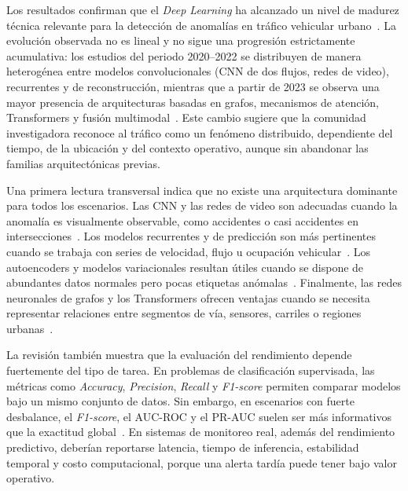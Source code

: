 \documentclass[12pt, a4paper]{article}
\begin{document}
Los resultados confirman que el \textit{Deep Learning} ha alcanzado un nivel de madurez t\'{e}cnica relevante para la detecci\'{o}n de anomal\'{i}as en tr\'{a}fico vehicular urbano~\cite{zhang2022automatic,park2025graph}. La evoluci\'{o}n observada no es lineal y no sigue una progresi\'{o}n estrictamente acumulativa: los estudios del periodo 2020--2022 se distribuyen de manera heterog\'{e}nea entre modelos convolucionales (CNN de dos flujos, redes de video), recurrentes y de reconstrucci\'{o}n, mientras que a partir de 2023 se observa una mayor presencia de arquitecturas basadas en grafos, mecanismos de atenci\'{o}n, Transformers y fusi\'{o}n multimodal~\cite{duan2025multimodal,chai2026road,park2025graph}. Este cambio sugiere que la comunidad investigadora reconoce al tr\'{a}fico como un fen\'{o}meno distribuido, dependiente del tiempo, de la ubicaci\'{o}n y del contexto operativo, aunque sin abandonar las familias arquitect\'{o}nicas previas.

Una primera lectura transversal indica que no existe una arquitectura dominante para todos los escenarios. Las CNN y las redes de video son adecuadas cuando la anomal\'{i}a es visualmente observable, como accidentes o casi accidentes en intersecciones~\cite{huang2020intelligent,khan2022anomaly}. Los modelos recurrentes y de predicci\'{o}n son m\'{a}s pertinentes cuando se trabaja con series de velocidad, flujo u ocupaci\'{o}n vehicular~\cite{jadhav2025multistage,jia2025prediction}. Los autoencoders y modelos variacionales resultan \'{u}tiles cuando se dispone de abundantes datos normales pero pocas etiquetas an\'{o}malas~\cite{hu2022detecting,chakraborty2023structural}. Finalmente, las redes neuronales de grafos y los Transformers ofrecen ventajas cuando se necesita representar relaciones entre segmentos de v\'{i}a, sensores, carriles o regiones urbanas~\cite{ren2024graph,park2025graph}.

La revisi\'{o}n tambi\'{e}n muestra que la evaluaci\'{o}n del rendimiento depende fuertemente del tipo de tarea. En problemas de clasificaci\'{o}n supervisada, las m\'{e}tricas como \textit{Accuracy}, \textit{Precision}, \textit{Recall} y \textit{F1-score} permiten comparar modelos bajo un mismo conjunto de datos. Sin embargo, en escenarios con fuerte desbalance, el \textit{F1-score}, el AUC-ROC y el PR-AUC suelen ser m\'{a}s informativos que la exactitud global~\cite{taheri2026applicability,wang2024multiscale}. En sistemas de monitoreo real, adem\'{a}s del rendimiento predictivo, deber\'{i}an reportarse latencia, tiempo de inferencia, estabilidad temporal y costo computacional, porque una alerta tard\'{i}a puede tener bajo valor operativo.
\end{document}
